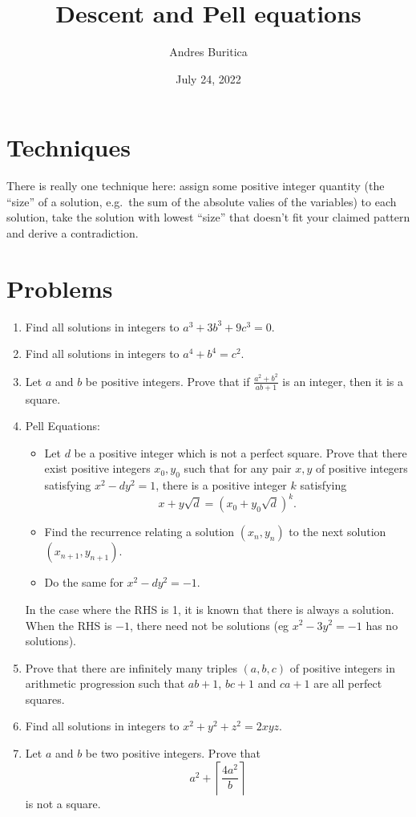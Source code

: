 \documentclass{article}
\title{Descent and Pell equations}
\author{Andres Buritica}
\date{July 24, 2022}
\begin{document}
\maketitle
\section{Techniques}
  There is really one technique here: assign some positive integer quantity
  (the ``size'' of a solution, e.g.\ the sum of the absolute valies of the
  variables) to each solution, take the solution with lowest
  ``size'' that doesn't fit your claimed pattern and derive a contradiction.
\section{Problems}
\begin{enumerate}
  \item Find all solutions in integers to $a^3+3b^3+9c^3=0$.
  \item Find all solutions in integers to $a^4+b^4=c^2$.
  \item Let $a$ and $b$ be positive integers.
    Prove that if \(\frac{a^2+b^2}{ab+1}\) is an integer, then it is a square.
  \item Pell Equations:
    \begin{itemize}
      \item Let $d$ be a positive integer which is not a perfect square. Prove that
      there exist positive integers $x_0,y_0$ such that for any pair $x,y$ of
      positive integers satisfying $x^2-dy^2=1$, there is a positive integer $k$
      satisfying
      \[x+y\sqrt d=(x_0+y_0\sqrt d)^k.\]
      \item Find the recurrence relating a solution $(x_n,y_n)$ to the next
        solution $(x_{n+1},y_{n+1})$.
      \item Do the same for $x^2-dy^2=-1$.
    \end{itemize}
    In the case where the RHS is 1, it is known that there is always a solution.
    When the RHS
    is $-1$, there need not be solutions (eg $x^2-3y^2=-1$ has no solutions).
  \item Prove that there are infinitely many triples $(a,b,c)$ of positive
    integers in arithmetic progression
    such that $ab+1$, $bc+1$ and $ca+1$ are all perfect squares.
  \item Find all solutions in integers to $x^2+y^2+z^2=2xyz$.
  \item Let $a$ and $b$ be two positive integers. Prove that
    \[a^2+\left\lceil\frac{4a^2}b\right\rceil\] is not a square.
\end{enumerate}
\newpage
\end{document}

